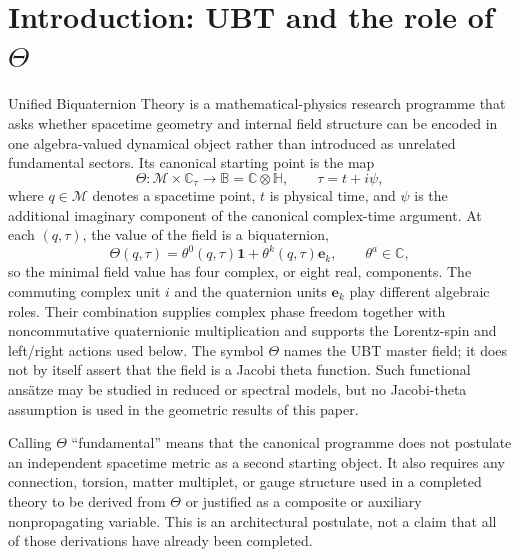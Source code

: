 \documentclass[12pt,a4paper]{article}
\theoremstyle{remark}\newtheorem{remark}[definition]{Remark}
\newcommand{\B}{\mathbb B}
\begin{document}
\section{Introduction: UBT and the role of \texorpdfstring{$\Theta$}{Theta}}
\label{sec:ubt-theta-introduction}
Unified Biquaternion Theory is a mathematical-physics research programme that
asks whether spacetime geometry and internal field structure can be encoded in
one algebra-valued dynamical object rather than introduced as unrelated
fundamental sectors.  Its canonical starting point is the map
\begin{equation}
 \boxed{\Theta:\mathcal M\times\mathbb C_\tau\longrightarrow
 \B=\mathbb C\otimes\mathbb H,\qquad \tau=t+i\psi,}
 \label{eq:theta-overview}
\end{equation}
where $q\in\mathcal M$ denotes a spacetime point, $t$ is physical time, and
$\psi$ is the additional imaginary component of the canonical complex-time
argument.  At each $(q,\tau)$, the value of the field is a biquaternion,
\begin{equation}
 \Theta(q,\tau)=\theta^0(q,\tau)\mathbf1
                +\theta^k(q,\tau)\mathbf e_k,
 \qquad \theta^a\in\mathbb C,
 \label{eq:theta-components-overview}
\end{equation}
so the minimal field value has four complex, or eight real, components.  The
commuting complex unit $i$ and the quaternion units $\mathbf e_k$ play
different algebraic roles.  Their combination supplies complex phase freedom
together with noncommutative quaternionic multiplication and supports the
Lorentz-spin and left/right actions used below.  The symbol $\Theta$ names the
UBT master field; it
does not by itself assert that the field is a Jacobi theta function.  Such
functional ans\"atze may be studied in reduced or spectral models, but no
Jacobi-theta assumption is used in the geometric results of this paper.

Calling $\Theta$ ``fundamental'' means that the canonical programme does not
postulate an independent spacetime metric as a second starting object.  It also
requires any connection, torsion, matter multiplet, or gauge structure used in
a completed theory to be derived from $\Theta$ or justified as a composite or
auxiliary nonpropagating variable.  This is an architectural postulate, not a
claim that all of those derivations have already been completed.
\end{document}
